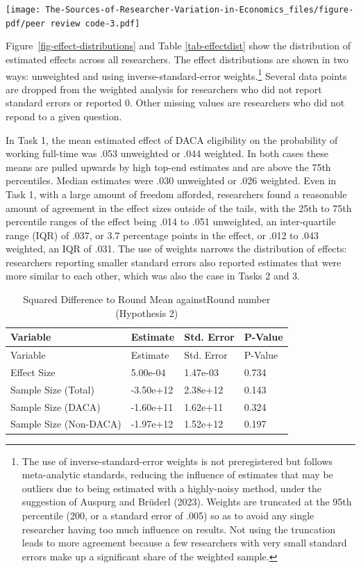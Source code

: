 \documentclass[
  letterpaper,
  DIV=11,
  numbers=noendperiod]{scrartcl}
\begin{document}
\texttt{[image: The-Sources-of-Researcher-Variation-in-Economics\_files/figure-pdf/peer review code-3.pdf]}

Figure~\ref{fig-effect-distributions} and Table \ref{tab-effectdist}
show the distribution of estimated effects across all researchers. The
effect distributions are shown in two ways: unweighted and using
inverse-standard-error weights.\footnote{The use of
  inverse-standard-error weights is not preregistered but follows
  meta-analytic standards, reducing the influence of estimates that may
  be outliers due to being estimated with a highly-noisy method, under
  the suggestion of Auspurg and Brüderl (2023). Weights are truncated at
  the 95th percentile (200, or a standard error of .005) so as to avoid
  any single researcher having too much influence on results. Not using
  the truncation leads to more agreement because a few researchers with
  very small standard errors make up a significant share of the weighted
  sample.} Several data points are dropped from the weighted analysis
for researchers who did not report standard errors or reported 0. Other
missing values are researchers who did not repond to a given question.

In Task 1, the mean estimated effect of DACA eligibility on the
probability of working full-time was .053 unweighted or .044 weighted.
In both cases these means are pulled upwards by high top-end estimates
and are above the 75th percentiles. Median estimates were .030
unweighted or .026 weighted. Even in Task 1, with a large amount of
freedom afforded, researchers found a reasonable amount of agreement in
the effect sizes outside of the tails, with the 25th to 75th percentile
ranges of the effect being .014 to .051 unweighted, an inter-quartile
range (IQR) of .037, or 3.7 percentage points in the effect, or .012 to
.043 weighted, an IQR of .031. The use of weights narrows the
distribution of effects: researchers reporting smaller standard errors
also reported estimates that were more similar to each other, which was
also the case in Tasks 2 and 3.

\begin{longtable}[]{@{}llll@{}}
\caption{Squared Difference to Round Mean against\linebreak Round number
(Hypothesis 2)\label{hypothesis-2}}\tabularnewline
\toprule\noalign{}
Variable & Estimate & Std. Error & P-Value \\
\midrule\noalign{}
\endfirsthead
\toprule\noalign{}
Variable & Estimate & Std. Error & P-Value \\
\midrule\noalign{}
\endhead
\bottomrule\noalign{}
\endlastfoot
Effect Size & 5.00e-04 & 1.47e-03 & 0.734 \\
Sample Size (Total) & -3.50e+12 & 2.38e+12 & 0.143 \\
Sample Size (DACA) & -1.60e+11 & 1.62e+11 & 0.324 \\
Sample Size (Non-DACA) & -1.97e+12 & 1.52e+12 & 0.197 \\
\end{longtable}
\end{document}
